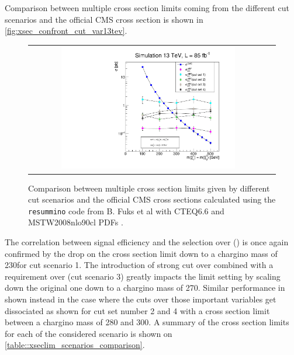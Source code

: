 Comparison between multiple cross section limits coming from the different cut scenarios and the official CMS cross section is shown in \autoref{fig:xsec_confront_cut_var13tev}.

\begin{figure}[tbh!]
	\centering
	\begin{tabular}{cc}
		\includegraphics[width=0.75\textwidth]{analysis/pics/out_xsecmin_cutvar.pdf}
	\end{tabular}
	\caption{Comparison between multiple cross section limits given by different cut scenarios and the official CMS cross sections calculated using the \texttt{resummino} code from B. Fuks et al with CTEQ6.6 and MSTW2008nlo90cl PDFs \cite{Fuks:2013vua}.}
	\label{fig:xsec_confront_cut_var13tev}
\end{figure}

The correlation between signal efficiency and the selection over \pt(\hadtau) is once again confirmed by the drop on the cross section limit down to a chargino mass of 230\gev for cut scenario 1. The introduction of strong cut over \mjj combined with a requirement over \met (cut scenario 3) greatly impacts the limit setting by scaling down the original one down to a chargino mass of 270\gev. Similar performance in shown instead in the case where the cuts over those important variables get dissociated as shown for cut set number 2 and 4 with a cross section limit between a chargino mass of 280 and 300\gev. A summary of the cross section limits for each of the considered scenario is shown on \autoref{table::xseclim_scenarios_comparison}.

